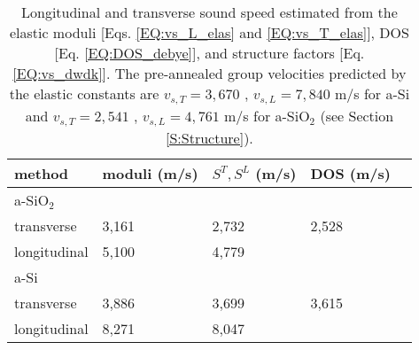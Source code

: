 \documentclass[aps,prb,onecolumn,preprint,superscriptaddress,footinbib,amsmath,amssymb,floatfix]{revtex4}
\begin{document}


\begin{center}
\begingroup
\begin{table}
\caption{\label{T:vs}
Longitudinal and transverse sound speed estimated from the elastic 
moduli [Eqs. \eqref{EQ:vs_L_elas} and \eqref{EQ:vs_T_elas}], 
DOS [Eq. \eqref{EQ:DOS_debye}], 
and structure factors [Eq. \eqref{EQ:vs_dwdk}]. 
The pre-annealed group velocities predicted by the elastic constants are 
$v_{s,T} = 3,670$ , $v_{s,L} = 7,840$ m/s for a-Si and
$v_{s,T} = 2,541$ , $v_{s,L} = 4,761 $ m/s for a-SiO$_2$ 
(see Section \ref{S:Structure}).
}
\begin{tabular}{lllll}
\hline
method & moduli (m/s) & $S^{T}, S^{L}$ (m/s) 
& DOS (m/s) & \\
\hline
a-SiO$_2$  \\
\hline
transverse & 3,161 & 2,732 & 2,528 &  \\
\hline
longitudinal & 5,100 &  4,779 & & \\
\hline
a-Si  \\
\hline
transverse & 3,886 & 3,699 & 3,615 & \\
\hline
longitudinal & 8,271 & 8,047 & &    \\
\hline
\end{tabular}
\end{table}
\endgroup
\end{center}
\end{document}
